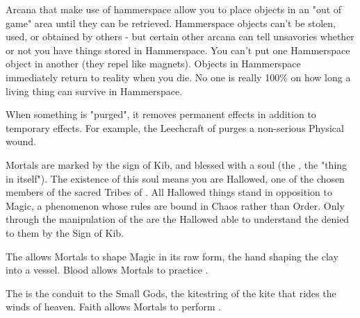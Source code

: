 {\begin{multicols}{2}

  Arcana that make use of hammerspace allow you to place objects in an "out of game" area until they can be retrieved.  Hammerspace objects can't be stolen, used, or obtained by others - but certain other arcana can tell unsavories whether or not you have things stored in Hammerspace.  You can't put one Hammerspace object in another (they repel like magnets). Objects in Hammerspace immediately return to reality when you die.  No one is really 100\% on how long a living thing can survive in Hammerspace.  

\cbreak

  
  When something is "purged", it removes permanent effects in addition to temporary effects.  For example, the Leechcraft of  purges a non-serious Physical wound.  

  \newpage


  Mortals are marked by the sign of Kib, and blessed with a soul (the , the "thing in itself").  The existence of this soul means you are Hallowed, one of the chosen members of the sacred Tribes of \TheAuthority.  All Hallowed things stand in opposition to Magic, a phenomenon whose rules are bound in Chaos rather than Order. Only through the manipulation of the  are the Hallowed able to understand the  denied to them by the Sign of Kib.



  The  allows Mortals to shape Magic in its raw form, the hand shaping the clay into a vessel. Blood allows Mortals to practice .


  The  is the conduit to the Small Gods, the kitestring of the kite that rides the winds of heaven.  Faith allows Mortals to perform .



\end{multicols}}
